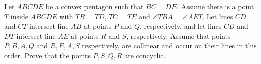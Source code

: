 Let $ABCDE$ be a convex pentagon such that $BC = DE$. Assume there is a point $T$ inside $ABCDE$ with $TB = TD$, $TC = TE$ and $\angle TBA = \angle AET$. Let lines $CD$ and $CT$ intersect line $AB$ at points $P$ and $Q$, respectively, and let lines $CD$ and $DT$ intersect line $AE$ at points $R$ and $S$, respectively. Assume that points $P, B, A, Q$ and $R, E, A, S$ respectively, are collinear and occur on their lines in this order. Prove that the points $P, S, Q, R$ are concyclic.
